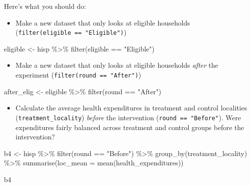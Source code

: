 \documentclass[
  letterpaper,
  DIV=11,
  numbers=noendperiod]{scrartcl}
\newenvironment{Shaded}{\begin{snugshade}}{\end{snugshade}}
\newcommand{\AttributeTok}[1]{\textcolor[rgb]{0.40,0.45,0.13}{#1}}
\newcommand{\FunctionTok}[1]{\textcolor[rgb]{0.28,0.35,0.67}{#1}}
\newcommand{\NormalTok}[1]{\textcolor[rgb]{0.00,0.23,0.31}{#1}}
\newcommand{\OtherTok}[1]{\textcolor[rgb]{0.00,0.23,0.31}{#1}}
\newcommand{\SpecialCharTok}[1]{\textcolor[rgb]{0.37,0.37,0.37}{#1}}
\newcommand{\StringTok}[1]{\textcolor[rgb]{0.13,0.47,0.30}{#1}}
\providecommand{\tightlist}{%
  \setlength{\itemsep}{0pt}\setlength{\parskip}{0pt}}\usepackage{longtable,booktabs,array}
\begin{document}
Here's what you should do:

\begin{itemize}
\tightlist
\item
  Make a new dataset that only looks at eligible households
  (\texttt{filter(eligible\ ==\ "Eligible")})
\end{itemize}

\begin{Shaded}
\begin{Highlighting}[numbers=left,,]
\NormalTok{eligible }\OtherTok{\textless{}{-}}\NormalTok{ hisp }\SpecialCharTok{\%\textgreater{}\%} 
  \FunctionTok{filter}\NormalTok{(eligible }\SpecialCharTok{==} \StringTok{"Eligible"}\NormalTok{)}
\end{Highlighting}
\end{Shaded}

\begin{itemize}
\tightlist
\item
  Make a new dataset that only looks at eligible households \emph{after}
  the experiment (\texttt{filter(round\ ==\ "After")})
\end{itemize}

\begin{Shaded}
\begin{Highlighting}[numbers=left,,]
\NormalTok{after\_elig }\OtherTok{\textless{}{-}}\NormalTok{ eligible }\SpecialCharTok{\%\textgreater{}\%} 
  \FunctionTok{filter}\NormalTok{(round }\SpecialCharTok{==} \StringTok{"After"}\NormalTok{)}
\end{Highlighting}
\end{Shaded}

\begin{itemize}
\tightlist
\item
  Calculate the average health expenditures in treatment and control
  localities (\texttt{treatment\_locality}) \emph{before} the
  intervention (\texttt{round\ ==\ "Before"}). Were expenditures fairly
  balanced across treatment and control groups before the intervention?
\end{itemize}

\begin{Shaded}
\begin{Highlighting}[numbers=left,,]
\NormalTok{b4 }\OtherTok{\textless{}{-}}\NormalTok{ hisp }\SpecialCharTok{\%\textgreater{}\%} 
  \FunctionTok{filter}\NormalTok{(round }\SpecialCharTok{==} \StringTok{"Before"}\NormalTok{) }\SpecialCharTok{\%\textgreater{}\%} 
  \FunctionTok{group\_by}\NormalTok{(treatment\_locality) }\SpecialCharTok{\%\textgreater{}\%} 
  \FunctionTok{summarise}\NormalTok{(}\AttributeTok{loc\_mean =} \FunctionTok{mean}\NormalTok{(health\_expenditures))}

\NormalTok{b4}
\end{Highlighting}
\end{Shaded}
\end{document}
